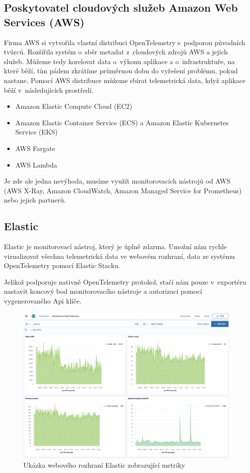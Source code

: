 \subsection{Poskytovatel cloudových služeb Amazon Web Services (AWS)}
Firma AWS si vytvořila vlastní distribuci OpenTelemetry s~podporou původních tvůrců. Rozšířila systém o~sběr metadat z~cloudových zdrojů AWS a jejich služeb. Můžeme tedy korelovat data o~výkonu aplikace a o~infrastruktuře, na které běží, tím pádem zkrátíme průměrnou dobu do vyřešení problému, pokud nastane. Pomocí AWS distribuce můžeme sbírat telemetrická data, když aplikace běží v~následujících prostředí.
    \begin{itemize}
        \item{Amazon Elastic Compute Cloud (EC2)}
        \item{Amazon Elastic Container Service (ECS) a Amazon Elastic Kubernetes Service (EKS)}
        \item{AWS Fargate}
        \item{AWS Lambda}
    \end{itemize}

Je zde ale jedna nevýhoda, musíme využít monitorovacích nástrojů od AWS (AWS X-Ray, Amazon CloudWatch, Amazon Managed Service for Prometheus) nebo jejich partnerů.

\subsection{Elastic}
Elastic je monitorovací nástroj, který je úplně zdarma. Umožní nám rychle vizualizovat všechna telemetrická data ve webovém rozhraní, data ze systému OpenTelemetry pomocí Elastic Stacku. 

Jelikož podporuje nativně OpenTelemetry protokol, stačí nám pouze v~exportéru nastavit koncový bod monitorovacího nástroje a autorizaci pomocí vygenerovaného Api klíče.

\begin{figure}[H]
  \centering
  \includegraphics[width=13.5cm]{obrazky-figures/elastic.png}
  \caption{Ukázka webového rozhraní Elastic zobrazující metriky\protect\footnotemark}
  \label{fig:elastic}
\end{figure}

